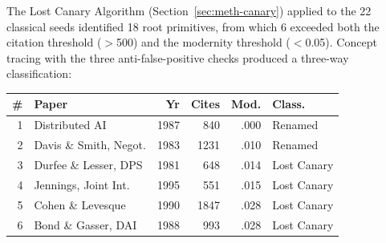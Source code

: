 \documentclass{article}
\begin{document}
%
%
%
%
%

The Lost Canary Algorithm (Section~\ref{sec:meth-canary}) applied to the 22 classical
seeds identified 18 root primitives, from which 6 exceeded both the citation threshold
($>$500) and the modernity threshold ($<$0.05). Concept tracing with the three
anti-false-positive checks produced a three-way classification:

\begin{center}
\footnotesize
\begin{tabular}{@{} r p{2.5cm} r r r l @{}}
\toprule
\textbf{\#} & \textbf{Paper} & \textbf{Yr} & \textbf{Cites} & \textbf{Mod.} & \textbf{Class.} \\
\midrule
1 & Distributed AI & 1987 & 840 & .000 & Renamed \\
2 & Davis \& Smith, Negot. & 1983 & 1231 & .010 & Renamed \\
3 & Durfee \& Lesser, DPS & 1981 & 648 & .014 & Lost Canary \\
4 & Jennings, Joint Int. & 1995 & 551 & .015 & Lost Canary \\
5 & Cohen \& Levesque & 1990 & 1847 & .028 & Lost Canary \\
6 & Bond \& Gasser, DAI & 1988 & 993 & .028 & Lost Canary \\
\bottomrule
\end{tabular}
\end{center}
\end{document}
